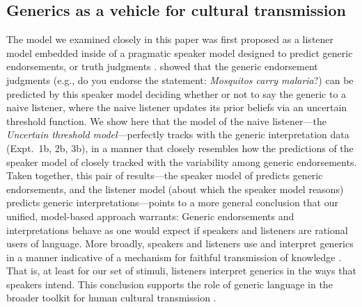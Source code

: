 \documentclass[floatsintext,man]{apa6}
\begin{document}
\subsection{Generics as a vehicle for cultural transmission}

The model we examined closely in this paper was first proposed as a listener model embedded inside of a pragmatic speaker model designed to predict generic endorsements, or truth judgments \cite{Tessler2019psychrev}.
 showed that the generic endorsement judgments (e.g., do you endorse the statement:  \emph{Mosquitos carry malaria}?) can be predicted by this speaker model deciding whether or not to say the generic to a naive listener, where the naive listener updates its prior beliefs via an uncertain threshold function. 
We show here that the model of the naive listener---the \emph{Uncertain threshold model}---perfectly tracks with the generic interpretation data (Expt.~1b, 2b, 3b), in a manner that closely resembles how the predictions of the  speaker model of  closely tracked with the variability among generic endorsements.
Taken together, this pair of results---the speaker model of  predicts generic endorsements, and the listener model (about which the speaker model reasons) predicts generic interpretations---points to a more general conclusion that our unified, model-based approach warrants: Generic endorsements and interpretations behave as one would expect if speakers and listeners are rational users of language. 
More broadly, speakers and listeners use and interpret generics in a manner indicative of a mechanism for faithful transmission of knowledge \cite{Tomasello1999}. 
That is, at least for our set of stimuli, listeners interpret generics in the ways that speakers intend.
This conclusion supports the role of generic language in the broader toolkit for human cultural transmission \cite<see also>{tomasello2016cultural, gelman2017language}.

\end{document}
